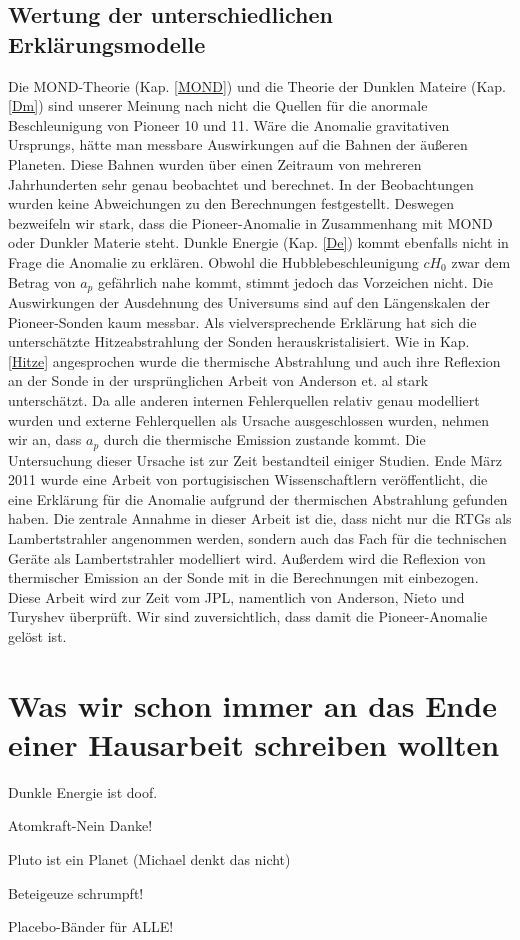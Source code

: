 \subsection{Wertung der unterschiedlichen Erklärungsmodelle}
Die MOND-Theorie (Kap. \ref {MOND}) und die Theorie der Dunklen Mateire (Kap. \ref {Dm}) sind unserer Meinung nach nicht die Quellen für die anormale Beschleunigung von Pioneer 10 und 11. Wäre die Anomalie gravitativen Ursprungs, hätte man messbare Auswirkungen auf die Bahnen der äußeren Planeten. Diese Bahnen wurden über einen Zeitraum von mehreren Jahrhunderten sehr genau beobachtet und berechnet. In der Beobachtungen wurden keine Abweichungen zu den Berechnungen festgestellt. Deswegen bezweifeln wir stark, dass die Pioneer-Anomalie in Zusammenhang mit MOND oder Dunkler Materie steht.
\bigskip
Dunkle Energie (Kap. \ref{De}) kommt ebenfalls nicht in Frage die Anomalie zu erklären. Obwohl die Hubblebeschleunigung $cH_0$ zwar dem Betrag von $a_p$ gefährlich nahe kommt, stimmt jedoch das Vorzeichen nicht. Die Auswirkungen der Ausdehnung des Universums sind auf den Längenskalen der Pioneer-Sonden kaum messbar.
\bigskip
Als vielversprechende Erklärung hat sich die unterschätzte Hitzeabstrahlung der Sonden herauskristalisiert. Wie in Kap. \ref{Hitze} angesprochen wurde die thermische Abstrahlung und auch ihre Reflexion an der Sonde in der ursprünglichen Arbeit von Anderson et. al \cite{Anderson2002} stark unterschätzt. Da alle anderen internen Fehlerquellen relativ genau modelliert wurden und externe Fehlerquellen als Ursache ausgeschlossen wurden, nehmen wir an, dass $a_p$ durch die thermische Emission zustande kommt. Die Untersuchung dieser Ursache ist zur Zeit bestandteil einiger Studien. Ende März 2011 wurde eine Arbeit von portugisischen Wissenschaftlern\cite{port2011} veröffentlicht, die eine Erklärung für die Anomalie aufgrund der thermischen Abstrahlung gefunden haben. Die zentrale Annahme in dieser Arbeit ist die, dass nicht nur die RTGs als Lambertstrahler angenommen werden, sondern auch das Fach für die technischen Geräte als Lambertstrahler modelliert wird. Außerdem wird die Reflexion von thermischer Emission an der Sonde mit in die Berechnungen mit einbezogen. Diese Arbeit wird zur Zeit vom JPL, namentlich von Anderson, Nieto und Turyshev überprüft. Wir sind zuversichtlich, dass damit die Pioneer-Anomalie gelöst ist.



\section{Was wir schon immer an das Ende einer Hausarbeit schreiben wollten}

\bigskip
Dunkle Energie ist doof.

\bigskip
Atomkraft-Nein Danke!

\bigskip
Pluto ist ein Planet (Michael denkt das nicht)

\bigskip
Beteigeuze schrumpft!
\bigskip

Placebo-Bänder für ALLE!
